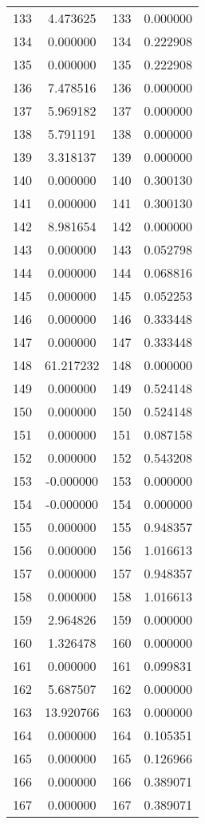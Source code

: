 \documentclass[12pt]{article}
\begin{document}
\begin{longtable}{@{}cccc@{}}
133 & 4.473625 & 133 & 0.000000 \\
134 & 0.000000 & 134 & 0.222908 \\
135 & 0.000000 & 135 & 0.222908 \\
136 & 7.478516 & 136 & 0.000000 \\
137 & 5.969182 & 137 & 0.000000 \\
138 & 5.791191 & 138 & 0.000000 \\
139 & 3.318137 & 139 & 0.000000 \\
140 & 0.000000 & 140 & 0.300130 \\
141 & 0.000000 & 141 & 0.300130 \\
142 & 8.981654 & 142 & 0.000000 \\
143 & 0.000000 & 143 & 0.052798 \\
144 & 0.000000 & 144 & 0.068816 \\
145 & 0.000000 & 145 & 0.052253 \\
146 & 0.000000 & 146 & 0.333448 \\
147 & 0.000000 & 147 & 0.333448 \\
148 & 61.217232 & 148 & 0.000000 \\
149 & 0.000000 & 149 & 0.524148 \\
150 & 0.000000 & 150 & 0.524148 \\
151 & 0.000000 & 151 & 0.087158 \\
152 & 0.000000 & 152 & 0.543208 \\
153 & -0.000000 & 153 & 0.000000 \\
154 & -0.000000 & 154 & 0.000000 \\
155 & 0.000000 & 155 & 0.948357 \\
156 & 0.000000 & 156 & 1.016613 \\
157 & 0.000000 & 157 & 0.948357 \\
158 & 0.000000 & 158 & 1.016613 \\
159 & 2.964826 & 159 & 0.000000 \\
160 & 1.326478 & 160 & 0.000000 \\
161 & 0.000000 & 161 & 0.099831 \\
162 & 5.687507 & 162 & 0.000000 \\
163 & 13.920766 & 163 & 0.000000 \\
164 & 0.000000 & 164 & 0.105351 \\
165 & 0.000000 & 165 & 0.126966 \\
166 & 0.000000 & 166 & 0.389071 \\
167 & 0.000000 & 167 & 0.389071 \\

\end{longtable}
\end{document}
